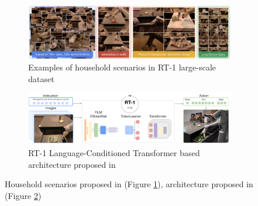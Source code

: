 \begin{figure}[htb]
    \centering
    \begin{subfigure}[b]{0.45\textwidth}
        \includegraphics[width=\textwidth]{Figures/images/rt_1/dataset_image.png}
        \caption{Examples of household scenarios in RT-1 large-scale dataset}
        \label{fig:rt_1_dataset}
    \end{subfigure}
    \hfill
    \begin{subfigure}[b]{0.5\textwidth}
        \includegraphics[width=\textwidth]{Figures/images/rt_1/model.png}
        \caption{RT-1 Language-Conditioned Transformer based architecture proposed in \cite{brohan2022rt}}
        \label{fig:rt_1_model}
    \end{subfigure}
    \hfill
    \caption{Household scenarios proposed in \cite{brohan2022rt} (Figure \ref{fig:rt_1_dataset}), architecture proposed in \cite{brohan2022rt} (Figure \ref{fig:rt_1_model})}
    \label{fig:rt_1_dataset_and_architecture}
\end{figure}

